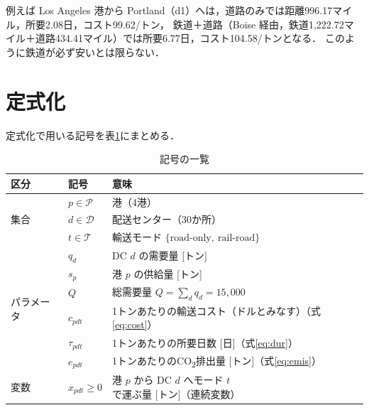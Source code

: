 \documentclass[a4paper,11pt]{ltjsarticle}
\newcommand{\Pset}{\mathcal{P}}
\newcommand{\Dset}{\mathcal{D}}
\newcommand{\Tset}{\mathcal{T}}
\newcommand{\COO}{CO\textsubscript{2}}
\begin{document}
例えば Los Angeles 港から Portland（d1）へは，道路のみでは距離996.17マイル，所要2.08日，コスト99.62/トン，
鉄道＋道路（Boise 経由，鉄道1,222.72マイル＋道路434.41マイル）では所要6.77日，コスト104.58/トンとなる．
このように鉄道が必ず安いとは限らない．

\section{定式化}\label{sec:model}
定式化で用いる記号を表\ref{tab:notation}にまとめる．

\begin{table}[tbp]
\centering
\caption{記号の一覧}\label{tab:notation}
\small
\begin{tabular}{ll>{\raggedright\arraybackslash}p{8.6cm}}
\toprule
区分 & 記号 & 意味 \\
\midrule
\multirow{3}{*}{集合}
 & $p \in \Pset$ & 港（4港） \\
 & $d \in \Dset$ & 配送センター（30か所） \\
 & $t \in \Tset$ & 輸送モード $\{\text{road-only},\ \text{rail-road}\}$ \\
\midrule
\multirow{6}{*}{パラメータ}
 & $q_d$ & DC $d$ の需要量 [トン] \\
 & $s_p$ & 港 $p$ の供給量 [トン] \\
 & $Q$ & 総需要量 $Q=\sum_{d}q_d=15{,}000$ \\
 & $c_{pdt}$ & 1トンあたりの輸送コスト（ドルとみなす）（式\eqref{eq:cost}） \\
 & $\tau_{pdt}$ & 1トンあたりの所要日数 [日]（式\eqref{eq:dur}） \\
 & $e_{pdt}$ & 1トンあたりの\COO{}排出量 [トン]（式\eqref{eq:emis}） \\
\midrule
変数 & $x_{pdt}\ge 0$ & 港 $p$ から DC $d$ へモード $t$ で運ぶ量 [トン]（連続変数） \\
\bottomrule
\end{tabular}
\end{table}
\end{document}

